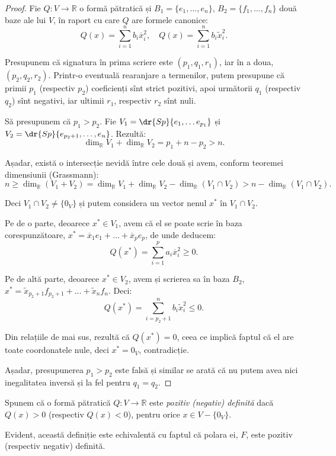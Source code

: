 \begin{proof}
	Fie $Q : V \to \mathbb{R}$ o formă pătratică și $B_1 = \{e_1, \dots, e_n\}$,
$B_2 = \{f_1, \dots, f_n\}$ două baze ale lui $V$, în raport cu care $Q$ are
formele canonice: 
 \[
	Q(x) = \sum_{i=1}^n b_i \overline{x}_i^2, \quad 
	Q(x) = \sum_{i=1}^n b_i \widetilde{x}_i^2.
\]

Presupunem că signatura în prima scriere este $(p_1, q_1, r_1)$, iar în a doua,
$(p_2, q_2, r_2)$. Printr-o eventuală rearanjare a termenilor, putem presupune
că primii $p_1$ (respectiv $p_2$) coeficienți sînt strict pozitivi, apoi
următorii $q_1$ (respectiv $q_2$) sînt negativi, iar ultimii $r_1$, respectiv
$r_2$ sînt nuli.

Să presupunem că $p_1 > p_2$. Fie $V_1 = \dr{Sp} \{e_1, \dots e_{p_1}\}$ și
$V_2 = \dr{Sp} \{e_{p_2 + 1}, \dots, e_n\}$. Rezultă: 
 \[
	\dim_{\mathbb{R}} V_1 + \dim_{\mathbb{R}} V_2 = p_1 + n - p_2 > n.
\]

Așadar, există o intersecție nevidă între cele două și avem, conform teoremei
dimensiunii (Grassmann): 
 \[
	n \geq \dim_{\mathbb{R}}(V_1 + V_2) = \dim_{\mathbb{R}} V_1 + 
	\dim_{\mathbb{R}} V_2 - \dim_{\mathbb{R}} (V_1 \cap V_2) > 
	n - \dim_{\mathbb{R}} (V_1 \cap V_2).
\]

Deci $V_1 \cap V_2 \neq \{0_V\}$ și putem considera un vector nenul $x^\ast$ în
$V_1 \cap V_2$.

Pe de o parte, deoarece $x^\ast \in V_1$, avem că el se poate scrie în baza
corespunzătoare, $x^\ast = \overline{x}_1 e_1 + \dots + \overline{x}_p e_p$,
de unde deducem: 
 \[
	Q(x^\ast) = \sum_{i=1}^p a_i \overline{x}_i^2 \geq 0.
\]

Pe de altă parte, deoarece $x^\ast \in V_2$, avem și scrierea sa în baza
$B_2$, $x^\ast = \widetilde{x}_{p_2 + 1} f_{p_2 + 1} + \dots + 
                 \widetilde{x}_n f_n$. Deci: 
 \[
	Q(x^\ast) = \sum_{i = p_2 + 1}^n b_i \widetilde{x}_i^2 \leq 0.
\]

Din relațiile de mai sus, rezultă că $Q(x^\ast) = 0$, ceea ce implică faptul
că el are toate coordonatele nule, deci $x^\ast = 0_V$, contradicție.

Așadar, presupunerea $p_1 > p_2$ este falsă și similar se arată că nu putem avea
nici inegalitatea inversă și la fel pentru $q_1 = q_2$.
\end{proof}

\begin{definition}
	Spunem că o formă pătratică $Q : V \to \mathbb{R}$ este \emph{pozitiv 
(negativ) definită} dacă $Q(x) > 0$ (respectiv $Q(x) < 0$), pentru orice
$x \in V - \{0_V\}$. 

Evident, această definiție este echivalentă cu faptul că polara ei, $F$,
este pozitiv (respectiv negativ) definită.
\end{definition}

